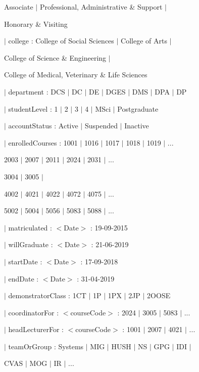 \documentclass[a4paper,11pt]{article}
\begin{document}
\hspace{3.05cm}Associate $|$ Professional, Administrative \& Support $|$ \par
\hspace{3.05cm}Honorary \& Visiting \par
\hspace{1.05cm}$|$ college : College of Social Sciences $|$ College of Arts $|$ \par
\hspace{2.8cm}College of Science \& Engineering $|$ \par
\hspace{2.8cm}College of Medical, Veterinary \& Life Sciences \par
\hspace{1.05cm}$|$ department : DCS $|$ DC $|$ DE $|$ DGES $|$ DMS $|$ DPA $|$ DP \par
\hspace{1.05cm}$|$ studentLevel : 1 $|$ 2 $|$ 3 $|$ 4 $|$ MSci $|$ Postgraduate \par
\hspace{1.05cm}$|$ accountStatus : Active $|$ Suspended $|$ Inactive \par
\hspace{1.05cm}$|$ enrolledCourses : 1001 $|$ 1016 $|$ 1017 $|$ 1018 $|$ 1019 $|$ ... \par
\hspace{4.33cm}2003 $|$ 2007 $|$ 2011 $|$ 2024 $|$ 2031 $|$ ... \par
\hspace{4.33cm}3004 $|$ 3005 $|$ \par
\hspace{4.33cm}4002 $|$ 4021 $|$ 4022 $|$ 4072 $|$ 4075 $|$ ... \par
\hspace{4.33cm}5002 $|$ 5004 $|$ 5056 $|$ 5083 $|$ 5088 $|$ ... \par
\hspace{1.05cm}$|$ matriculated : $<$Date$>$ : 19-09-2015 \par
\hspace{1.05cm}$|$ willGraduate : $<$Date$>$ : 21-06-2019 \par
\hspace{1.05cm}$|$ startDate : $<$Date$>$ : 17-09-2018 \par
\hspace{1.05cm}$|$ endDate : $<$Date$>$ : 31-04-2019 \par
\hspace{1.05cm}$|$ demonstratorClass : 1CT $|$ 1P $|$ 1PX $|$ 2JP $|$ 2OOSE \par
\hspace{1.05cm}$|$ coordinatorFor : $<$courseCode$>$ : 2024 $|$ 3005 $|$ 5083 $|$ ... \par
\hspace{1.05cm}$|$ headLecturerFor : $<$courseCode$>$ : 1001 $|$ 2007 $|$ 4021 $|$ ... \par
\hspace{1.05cm}$|$ teamOrGroup : Systems $|$ MIG $|$ HUSH $|$ NS $|$ GPG $|$ IDI $|$ \par
\hspace{4cm}CVAS $|$ MOG $|$ IR $|$ ... \par
\end{document}
